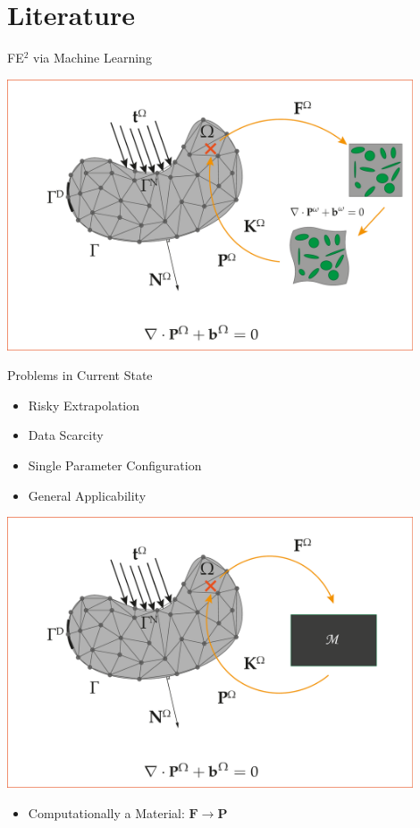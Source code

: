 \section{Literature}

\begin{frame}{FE$^2$ via Machine Learning}
  \begin{minipage}{0.5\textwidth}
  {
    \centering
    \includegraphics[width=0.9\textwidth]{Figures/intro/FE2-CONV}
  }
  {
    \begin{block}{\color{White} Problems in Current State}
      \begin{itemize}
        \item Risky Extrapolation
        \item Data Scarcity
        \item Single Parameter Configuration
        \item General Applicability
      \end{itemize}
    \end{block}
  
  }
  \end{minipage}%
  \begin{minipage}{0.5\textwidth}
  {
    \centering
    \includegraphics[width=0.9\textwidth]{Figures/literature/FE2-ML}
  }
  \end{minipage}
{
  \begin{itemize}
  \centering
    \item \color{Pink} Computationally a Material: $\mathbf{F} \to \mathbf{P}$
  \end{itemize}
}
\end{frame}

